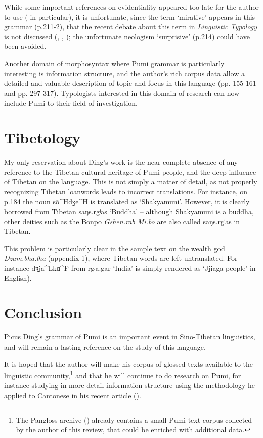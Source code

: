 \documentclass[oldfontcommands,oneside,a4paper,11pt]{article}
\newcommand{\ipa}[1]{{\phon #1}} %
\begin{document}
While some important references on evidentiality appeared too late for the author to  use (\citealt{tournadre14evidentiality} in particular), it is unfortunate, since the term `mirative' appears in this grammar (p.211-2), that the recent debate about this term in \textit{Linguistic Typology} is not discussed (\citealt{hill12mirativity}, \citealt{delancey12still}, \citealt{aikhenvald12mirativity}); the unfortunate neologism `surprisive' (p.214) could have been avoided. 

Another domain of morphosyntax where Pumi grammar is particularly interesting is information structure, and the author's rich corpus data allow a detailed and valuable description of topic and focus in this language (pp. 155-161 and pp. 297-317). Typologists interested in this domain of research can now include Pumi to their field of investigation.


\section{Tibetology}
My only reservation about Ding's work is the near complete absence of any reference to the Tibetan cultural heritage of Pumi people, and the deep influence of Tibetan on the language. This is not simply a matter of detail, as not properly recognizing Tibetan loanwords leads to incorrect translations. For instance,  on p.184 the noun \ipa{sõ^Hdʒe^H} is translated as `Shakyamuni'. However, it is clearly borrowed from Tibetan \ipa{saŋs.rgʲas} `Buddha' -- although Shakyamuni is a buddha, other deities such as the Bonpo  \textit{Gshen.rab Mi.bo} are also called \ipa{saŋs.rgʲas} in Tibetan. 


This problem is particularly clear in the sample text on the wealth god \textit{Dzam.bha.lha} (appendix 1), where Tibetan words are left untranslated. For instance \ipa{dʒja^Lkɑ^F} from \ipa{rgʲa.gar} `India' is simply rendered as `Jjiaga people' in English).

\section{Conclusion}
Picus Ding's grammar of Pumi is an important event in Sino-Tibetan linguistics, and will remain a lasting reference on the study of this language.

It is hoped that the author will make his corpus of glossed texts available to the linguistic community,\footnote{The Pangloss archive (\citealt{michailovsky14pangloss}) already contains a small Pumi text corpus collected by the author of this review, that could be enriched with additional data. } and that he will continue to do research on Pumi, for instance studying in more detail information structure  using the methodology he applied to Cantonese in his recent article (\citealt{ding14cantonese}).




 
\end{document}
